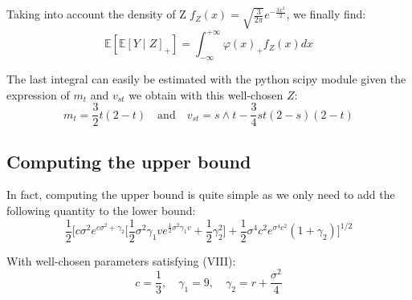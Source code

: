 \documentclass{article}
\begin{document}
Taking into account the density of Z $f_Z(x)=\sqrt{\frac{3}{2\pi}} e^{-\frac{3x^2}{2}}$, we finally find:
\begin{equation}
	\mathbb{E}[\mathbb{E}[Y\mid Z]_{+}]=\int_{-\infty}^{+\infty}\varphi (x)_{+}f_Z(x)dx
	\tag{IX}
\end{equation}

The last integral can easily be estimated with the python scipy module given the expression of
$m_t$ and $v_{st}$ we obtain with this well-chosen $Z$:
\[
	m_t = \frac{3}{2} t (2-t) \quad \text{and} \quad v_{st} = s \wedge t - \frac{3}{4} st (2-s)(2-t)
\]

\subsection{Computing the upper bound}

In fact, computing the upper bound is quite simple as we only need to add
the following quantity to the lower bound:
\[
	\frac{1}{2}\Biggl[c\sigma^{2}e^{c\sigma^{2}+\gamma_{2}}\biggl[\frac{1}{2}\sigma^{2}\gamma_{1}v e^{{\frac{1}{2}}
	\sigma^{2}\gamma_{1}v}+{\textstyle{\frac{1}{2}}}\gamma_{2}^{2}\biggr]+{\textstyle{\frac{1}{2}}}\sigma^{4}c^{2}
	e^{\sigma^{4}c^{2}}(1+\gamma_{2})\Biggr]^{1/2}
\]

With well-chosen parameters satisfying (VIII):
\[
    c=\frac{1}{3}, \quad
    \gamma_{1}=9, \quad
    \gamma_{2}=r+\frac{\sigma^{2}}{4} 
\]
\end{document}
